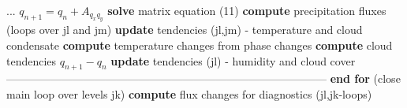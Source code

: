 \documentclass[
a4paper,     %
12pt,        %
article,
onecolumn,   %
openany,     %
]{memoir}
\begin{document}
%
%
\begin{algorithm}[H]
\begin{algorithmic}
\Indent
\Indent
\State ...
\State $q_{n+1} = q_{n} + A_{q_{x} q_{y}}$
\vspace{.1cm}
\State \textbf{solve} matrix equation (11) \label{lst:equation11} 
\State \textbf{compute} precipitation fluxes (loops over jl and jm)
\vspace{.2cm}
\State \textbf{update} tendencies (jl,jm) - temperature and cloud condensate
\Indent
\State \textbf{compute} temperature changes from phase changes
\State \textbf{compute} cloud tendencies $q_{n+1} - q_{n}$
\EndIndent
\vspace{.1cm}
\State \textbf{update} tendencies (jl) - humidity and cloud cover
\vspace{-.2cm}
\EndIndent
\State ---------------------------------------------------------------------------------------
\EndIndent
\State \textbf{end for} (close main loop over levels jk)
\State \textbf{compute} flux changes for diagnostics (jl,jk-loops)
\end{algorithmic}
\end{algorithm}
\end{document}
